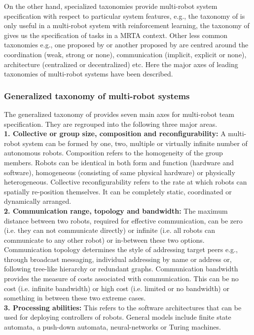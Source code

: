 On the other hand, specialized taxonomies provide multi-robot system specification with respect to particular system features, e.g., the taxonomy of  is only useful in a multi-robot system with reinforcement learning, the taxonomy of  gives us the specification of tasks in a MRTA context. Other less common taxonomies e.g., one proposed by  or another proposed by  are centred around the coordination (weak, strong or none), communication (implicit, explicit or none), architecture (centralized or decentralized) etc. Here the major axes of leading taxonomies of multi-robot systems have been described.
\subsubsection*{Generalized taxonomy of multi-robot systems}
The generalized taxonomy of  provides seven main axes for multi-robot team specification.  They are  regrouped into the following three major areas.\\
\textbf{1. Collective or group size, composition and reconfigurability: }  A multi-robot system can be formed by one, two, multiple or virtually infinite number of autonomous robots. Composition refers to the homogeneity of the group members. Robots can be identical in both form and function (hardware and software), homogeneous (consisting of same physical hardware) or physically heterogeneous. Collective reconfigurability refers to the rate at which robots can spatially re-position themselves. It can be completely static, coordinated or dynamically arranged.\\
\textbf{2. Communication range, topology and bandwidth: } The maximum distance between two robots, required for effective communication, can be zero (i.e. they can not communicate directly) or infinite (i.e. all robots can communicate to any other robot) or in-between these two options. Communication topology determines the style of addressing target peers e.g., through broadcast messaging, individual addressing by name or address or, following tree-like hierarchy or redundant graphs. Communication bandwidth provides the measure of costs associated with communication. This can be no cost (i.e. infinite bandwidth) or high cost (i.e. limited or no bandwidth) or something in between these two extreme cases.\\
\textbf{3. Processing abilities: } This refers to the software architectures that can be used for deploying controllers of robots. General models include finite state automata, a push-down automata, neural-networks or Turing machines. 
